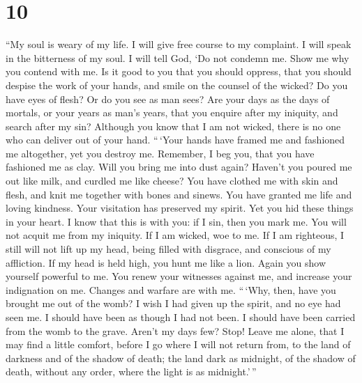 \hypertarget{section-9}{%
\section{10}\label{section-9}}

 ``My soul is weary of my life. I will give free course to
my complaint. I will speak in the bitterness of my soul. 
I will tell God, `Do not condemn me. Show me why you contend with me.
 Is it good to you that you should oppress, that you
should despise the work of your hands, and smile on the counsel of the
wicked?  Do you have eyes of flesh? Or do you see as man
sees?  Are your days as the days of mortals, or your years
as man's years,  that you enquire after my iniquity, and
search after my sin?  Although you know that I am not
wicked, there is no one who can deliver out of your hand. 
``\,`Your hands have framed me and fashioned me altogether, yet you
destroy me.  Remember, I beg you, that you have fashioned
me as clay. Will you bring me into dust again?  Haven't
you poured me out like milk, and curdled me like cheese? 
You have clothed me with skin and flesh, and knit me together with bones
and sinews.  You have granted me life and loving
kindness. Your visitation has preserved my spirit.  Yet
you hid these things in your heart. I know that this is with you:
 if I sin, then you mark me. You will not acquit me from
my iniquity.  If I am wicked, woe to me. If I am
righteous, I still will not lift up my head, being filled with disgrace,
and conscious of my affliction.  If my head is held high,
you hunt me like a lion. Again you show yourself powerful to me.
 You renew your witnesses against me, and increase your
indignation on me. Changes and warfare are with me. 
``\,`Why, then, have you brought me out of the womb? I wish I had given
up the spirit, and no eye had seen me.  I should have
been as though I had not been. I should have been carried from the womb
to the grave.  Aren't my days few? Stop! Leave me alone,
that I may find a little comfort,  before I go where I
will not return from, to the land of darkness and of the shadow of
death;  the land dark as midnight, of the shadow of
death, without any order, where the light is as midnight.'\,''

